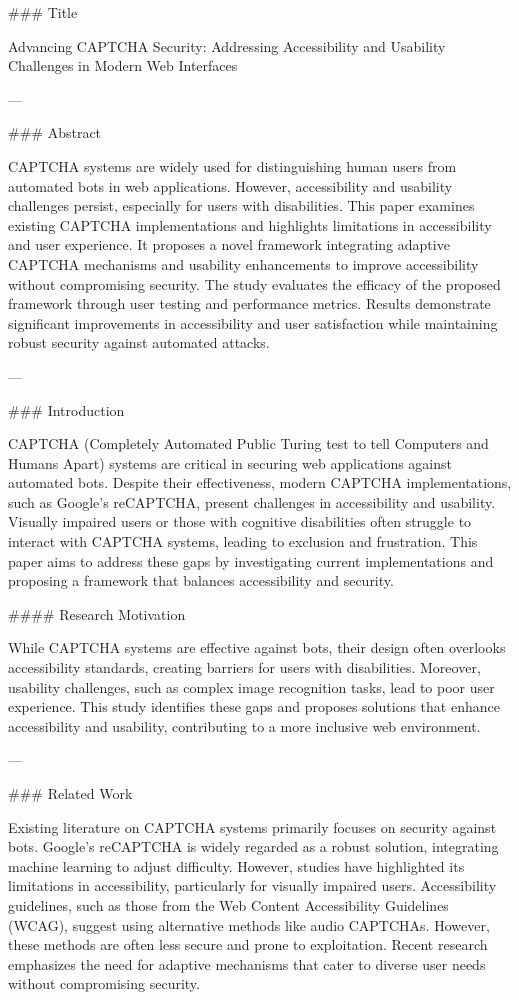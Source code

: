 ### Title

Advancing CAPTCHA Security: Addressing Accessibility and Usability Challenges in Modern Web Interfaces

---

### Abstract

CAPTCHA systems are widely used for distinguishing human users from automated bots in web applications. However, accessibility and usability challenges persist, especially for users with disabilities. This paper examines existing CAPTCHA implementations and highlights limitations in accessibility and user experience. It proposes a novel framework integrating adaptive CAPTCHA mechanisms and usability enhancements to improve accessibility without compromising security. The study evaluates the efficacy of the proposed framework through user testing and performance metrics. Results demonstrate significant improvements in accessibility and user satisfaction while maintaining robust security against automated attacks.

---

### Introduction

CAPTCHA (Completely Automated Public Turing test to tell Computers and Humans Apart) systems are critical in securing web applications against automated bots. Despite their effectiveness, modern CAPTCHA implementations, such as Google's reCAPTCHA, present challenges in accessibility and usability. Visually impaired users or those with cognitive disabilities often struggle to interact with CAPTCHA systems, leading to exclusion and frustration. This paper aims to address these gaps by investigating current implementations and proposing a framework that balances accessibility and security.

#### Research Motivation

While CAPTCHA systems are effective against bots, their design often overlooks accessibility standards, creating barriers for users with disabilities. Moreover, usability challenges, such as complex image recognition tasks, lead to poor user experience. This study identifies these gaps and proposes solutions that enhance accessibility and usability, contributing to a more inclusive web environment.

---

### Related Work

Existing literature on CAPTCHA systems primarily focuses on security against bots. Google's reCAPTCHA is widely regarded as a robust solution, integrating machine learning to adjust difficulty. However, studies have highlighted its limitations in accessibility, particularly for visually impaired users. Accessibility guidelines, such as those from the Web Content Accessibility Guidelines (WCAG), suggest using alternative methods like audio CAPTCHAs. However, these methods are often less secure and prone to exploitation. Recent research emphasizes the need for adaptive mechanisms that cater to diverse user needs without compromising security.


